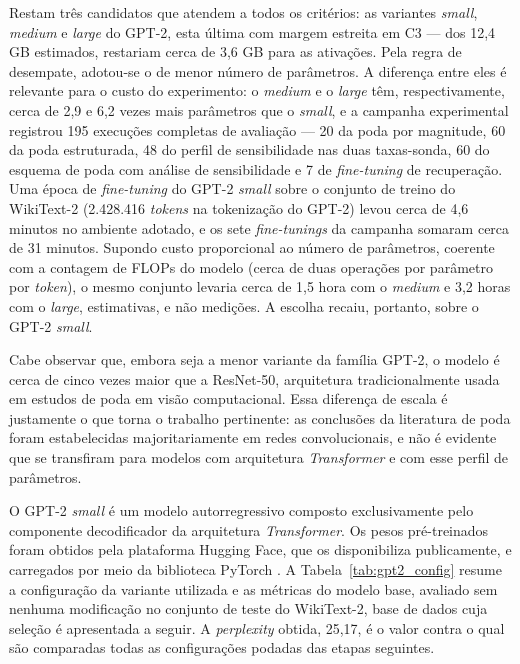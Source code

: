 Restam três candidatos que atendem a todos os critérios: as variantes \textit{small},
\textit{medium} e \textit{large} do GPT-2, esta última com margem estreita em C3 --- dos
12,4 GB estimados, restariam cerca de 3,6 GB para as ativações. Pela regra de desempate,
adotou-se o de menor número de parâmetros.
A diferença entre eles é relevante para o custo do experimento: o \textit{medium} e o
\textit{large} têm, respectivamente, cerca de 2,9 e 6,2 vezes mais parâmetros que o
\textit{small}, e a campanha experimental registrou 195 execuções completas de avaliação ---
20 da poda por magnitude, 60 da poda estruturada, 48 do perfil de sensibilidade nas duas
taxas-sonda, 60 do esquema de poda com análise de sensibilidade e 7 de \textit{fine-tuning}
de recuperação. Uma época de \textit{fine-tuning} do GPT-2 \textit{small} sobre o conjunto de
treino do WikiText-2 (2.428.416 \textit{tokens} na tokenização do GPT-2) levou cerca de 4,6 minutos no ambiente
adotado, e os sete \textit{fine-tunings} da campanha somaram cerca de 31 minutos. Supondo
custo proporcional ao número de parâmetros, coerente com a contagem de FLOPs do modelo
(cerca de duas operações por parâmetro por \textit{token}), o mesmo conjunto levaria cerca de
1,5 hora com o \textit{medium} e 3,2 horas com o \textit{large}, estimativas, e não
medições. A escolha recaiu, portanto, sobre o GPT-2 \textit{small}.

Cabe observar que, embora seja a menor variante da família GPT-2, o modelo é cerca de
cinco vezes maior que a ResNet-50, arquitetura tradicionalmente usada em estudos de poda
em visão computacional. Essa diferença de escala é justamente o que torna o trabalho
pertinente: as conclusões da literatura de poda foram estabelecidas majoritariamente em
redes convolucionais, e não é evidente que se transfiram para modelos com arquitetura
\textit{Transformer} e com esse perfil de parâmetros.

O GPT-2 \textit{small} é um modelo autorregressivo
composto exclusivamente pelo componente decodificador da arquitetura \textit{Transformer}.
Os pesos pré-treinados foram obtidos pela plataforma Hugging Face, que os disponibiliza
publicamente, e carregados por meio da biblioteca PyTorch \cite{Paszke2019}. A
Tabela~\ref{tab:gpt2_config} resume a configuração da variante utilizada e as métricas do
modelo base, avaliado sem nenhuma modificação no conjunto de teste do WikiText-2, base de
dados cuja seleção é apresentada a seguir. A \textit{perplexity} obtida, 25,17, é o valor
contra o qual são comparadas todas as configurações podadas das etapas seguintes.

